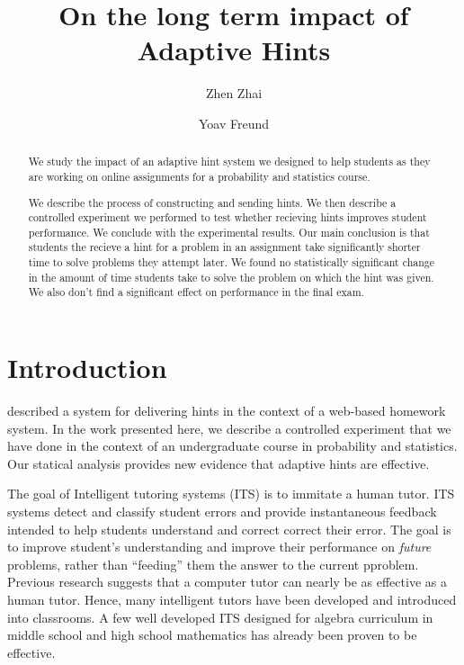 \documentclass{llncs2e/llncs}
\title{On the long term impact of Adaptive Hints}
\author{Zhen Zhai\inst{1} \and Yoav Freund\inst{2}}
\institute{UC San Diego \email{zzhai@eng.ucsd.edu} \and UC San Diego \email{yfreund@eng.ucsd.edu}}
\begin{document}
\maketitle


\begin{abstract}
  We study the impact of an adaptive hint system we designed to help
  students as they are working on online assignments for a probability
  and statistics course.

We describe the process of constructing and sending hints. We then
describe a controlled experiment we performed to test whether
recieving hints improves student performance. We conclude with the
experimental results. Our main conclusion is that students the recieve
a hint for a problem in an assignment take significantly shorter time
to solve problems they attempt later. We found no statistically
significant change in the amount of time students take to solve the
problem on which the hint was given. We also don't find a significant
effect on performance in the final exam.

\end{abstract}


\section{Introduction}

\cite{ElkherjFreund14} described a system for delivering hints in the
context of a web-based homework system. In the work presented here, we
describe a controlled experiment that we have done in the context of
an undergraduate course in probability and statistics. Our statical
analysis provides new evidence that adaptive hints are effective.


The goal of Intelligent tutoring systems (ITS)\cite{Anderson1995} is
to immitate a human tutor.  ITS systems detect and classify student
errors and provide instantaneous feedback intended to help students
understand and correct correct their error. The goal is to improve
student's understanding and improve their performance on {\em future}
problems, rather than ``feeding'' them the answer to the current
pproblem.  Previous research suggests that a computer tutor can nearly
be as effective as a human tutor\cite{Vanlehn2011}. Hence, many
intelligent tutors have been developed and introduced into
classrooms. A few well developed ITS designed for algebra curriculum
in middle school and high school mathematics has already been proven
to be effective\cite{Koedinger1997,John2014}.
\end{document}
